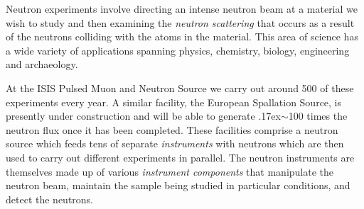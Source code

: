 Neutron experiments involve directing an intense neutron beam at a material we wish to study and then examining the \textit{neutron scattering} that occurs as a result of the neutrons colliding with the atoms in the material. This area of science has a wide variety of applications spanning physics, chemistry, biology, engineering and archaeology.

At the ISIS Pulsed Muon and Neutron Source we carry out around 500 of these experiments every year. A similar facility, the European Spallation Source, is presently under construction and will be able to generate {\raise.17ex\hbox{$\scriptstyle\sim$}}100 times the neutron flux once it has been completed. These facilities comprise a neutron source which feeds tens of separate \textit{instruments} with neutrons which are then used to carry out different experiments in parallel. The neutron instruments are themselves made up of various \textit{instrument components} that manipulate the neutron beam, maintain the sample being studied in particular conditions, and detect the neutrons.
